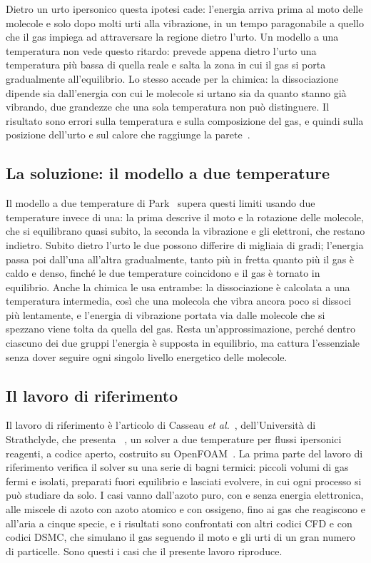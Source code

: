 Dietro un urto ipersonico questa ipotesi cade: l'energia arriva prima al moto
delle molecole e solo dopo molti urti alla vibrazione, in un tempo paragonabile
a quello che il gas impiega ad attraversare la regione dietro l'urto. Un
modello a una temperatura non vede questo ritardo: prevede appena dietro l'urto
una temperatura più bassa di quella reale e salta la zona in cui il gas si
porta gradualmente all'equilibrio. Lo stesso accade per la chimica: la
dissociazione dipende sia dall'energia con cui le molecole si urtano sia da
quanto stanno già vibrando, due grandezze che una sola temperatura non può
distinguere. Il risultato sono errori sulla temperatura e sulla composizione
del gas, e quindi sulla posizione dell'urto e sul calore che raggiunge la
parete~\cite{park1990}.

\subsection{La soluzione: il modello a due temperature}
\label{sec:soluzione}

Il modello a due temperature di Park~\cite{park1990,park1993} supera questi
limiti usando due temperature invece di una: la prima descrive il moto e la
rotazione delle molecole, che si equilibrano quasi subito, la seconda la
vibrazione e gli elettroni, che restano indietro. Subito dietro l'urto le due
possono differire di migliaia di gradi; l'energia passa poi dall'una all'altra
gradualmente, tanto più in fretta quanto più il gas è caldo e denso, finché le
due temperature coincidono e il gas è tornato in equilibrio. Anche la chimica
le usa entrambe: la dissociazione è calcolata a una temperatura intermedia,
così che una molecola che vibra ancora poco si dissoci più lentamente, e
l'energia di vibrazione portata via dalle molecole che si spezzano viene tolta
da quella del gas. Resta un'approssimazione, perché dentro ciascuno dei due
gruppi l'energia è supposta in equilibrio, ma cattura l'essenziale senza dover
seguire ogni singolo livello energetico delle molecole.

\subsection{Il lavoro di riferimento}
\label{sec:riferimento}

Il lavoro di riferimento è l'articolo di Casseau
\textit{et al.}~\cite{casseau2016}, dell'Università di Strathclyde, che
presenta \hyfoam~\cite{hystrath}, un solver a due temperature per flussi
ipersonici reagenti, a codice aperto, costruito su
OpenFOAM~\cite{openfoam13}. La
prima parte del lavoro di riferimento verifica il solver su una serie di bagni termici:
piccoli volumi di gas fermi e isolati, preparati fuori equilibrio e lasciati
evolvere, in cui ogni processo si può studiare da solo. I casi vanno dall'azoto
puro, con e senza energia elettronica, alle miscele di azoto con azoto atomico
e con ossigeno, fino ai gas che reagiscono e all'aria a cinque specie, e i
risultati sono confrontati con altri codici CFD e con codici DSMC, che
simulano il gas seguendo il moto e gli urti di un gran numero di particelle.
Sono questi i casi che il presente lavoro riproduce.

